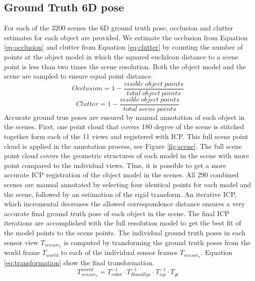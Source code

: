 \documentclass[10pt,twocolumn,letterpaper]{article}
\begin{document}
\subsection{Ground Truth 6D pose}\label{sec:gt_pose}
For each of the 3200 scenes the 6D ground truth pose, occlusion and clutter estimates for each object are provided. We estimate the occlusion from Equation \ref{eq:occlusion} and clutter from Equation \ref{eq:clutter} by counting the number of points at the object model in which the squared euclidean distance to a scene point is less than two times the scene resolution. Both the object model and the scene are sampled to ensure equal point distance.
\begin{equation}
Occlusion = 1 - \frac{visible \: object \: points }{total \: object \: points} 
\label{eq:occlusion}
\end{equation}
\begin{equation}
Clutter = 1 - \frac{visible \: object \: points}{total \: scene \: points}
\label{eq:clutter}
\end{equation}
\indent
Accurate ground true poses are ensured by manual annotation of each object in the scenes. First, one point cloud that covers 180 degree of the scene is stitched together form each of the 11 views and registered with ICP. This full scene point cloud is applied in the annotation process, see Figure \ref{fig:scene}. The full scene point cloud covers the geometric structures of each model in the scene with more point compared to the individual views. Thus, it is possible to get a more accurate ICP registration of the object model in the scenes. All 290 combined scenes are manual annotated by selecting four identical points for each model and the scene, followed by an estimation of the rigid transform. An iterative ICP, which incremental decreases the allowed correspondence distance ensures a very accurate final ground truth pose of each object in the scene. The final ICP iterations are accomplished with the full resolution model to get the best fit of the model points to the scene points. The individual ground truth poses in each sensor view $T_{sensor_{n}}$ is computed by transforming the ground truth poses from the world frame $T_{world}$ to each of the individual sensor frames $T_{sensor_{n}}$. Equation \ref{eq:transformation} show the final transformation. 
\begin{equation}
T^{world}_{sensor_{n}} = T^{-1}_{robot} \cdot T^{-1}_{HandEye} \cdot T^{-1}_{icp} \cdot T_{gt}
\label{eq:transformation}
\end{equation}
\end{document}

